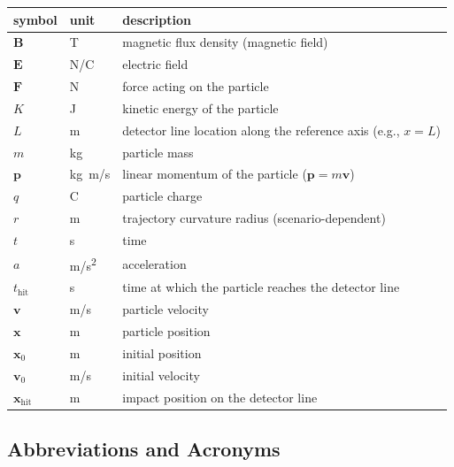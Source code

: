 \documentclass[12pt]{article}
\begin{document}
\renewcommand{\arraystretch}{1.2}
\noindent \begin{longtable*}{l l p{12cm}} \toprule
\textbf{symbol} & \textbf{unit} & \textbf{description}\\
\midrule
$\mathbf{B}$ & \unit[per-mode=symbol]{\tesla} & magnetic flux density (magnetic field)\\
$\mathbf{E}$ & \unit[per-mode=symbol]{\newton\per\coulomb} & electric field\\
$\mathbf{F}$ & \unit[per-mode=symbol]{\newton} & force acting on the particle\\
$K$          & \unit[per-mode=symbol]{\joule} & kinetic energy of the particle\\
$L$          & \unit[per-mode=symbol]{\metre} & detector line location along the reference axis (e.g., $x=L$)\\
$m$          & \unit[per-mode=symbol]{\kilogram} & particle mass\\
$\mathbf{p}$ & \unit[per-mode=symbol]{\kilogram\metre\per\second} & linear momentum of the particle ($\mathbf{p}=m\mathbf{v}$)\\
$q$          & \unit[per-mode=symbol]{\coulomb} & particle charge\\
$r$          & \unit[per-mode=symbol]{\metre} & trajectory curvature radius (scenario-dependent)\\
$t$          & \unit[per-mode=symbol]{\second} & time\\
$a$          & \unit[per-mode=symbol]{\metre\per\second\squared} & acceleration\\
$t_{\text{hit}}$ & \unit[per-mode=symbol]{\second} & time at which the particle reaches the detector line\\
$\mathbf{v}$ & \unit[per-mode=symbol]{\metre\per\second} & particle velocity\\
$\mathbf{x}$ & \unit[per-mode=symbol]{\metre} & particle position\\
$\mathbf{x}_0$ & \unit[per-mode=symbol]{\metre} & initial position\\
$\mathbf{v}_0$ & \unit[per-mode=symbol]{\metre\per\second} & initial velocity\\
$\mathbf{x}_{\text{hit}}$ & \unit[per-mode=symbol]{\metre} & impact position on the detector line\\
\bottomrule
\end{longtable*}

\subsection{Abbreviations and Acronyms}
\end{document}
